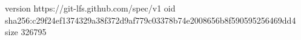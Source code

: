 version https://git-lfs.github.com/spec/v1
oid sha256:c29f24ef1374329a38f372d9af779c03378b74e2008656b8f590595256469dd4
size 326795
